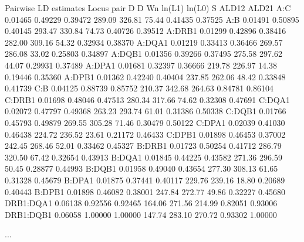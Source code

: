 \documentclass[letterpaper,10pt,english,openany,oneside]{sphinxmanual}
\begin{document}
\begin{sphinxVerbatim}[commandchars=\\\{\}]
Pairwise LD estimates
\PYGZhy{}\PYGZhy{}\PYGZhy{}\PYGZhy{}\PYGZhy{}\PYGZhy{}\PYGZhy{}\PYGZhy{}\PYGZhy{}\PYGZhy{}\PYGZhy{}\PYGZhy{}\PYGZhy{}\PYGZhy{}\PYGZhy{}\PYGZhy{}\PYGZhy{}\PYGZhy{}\PYGZhy{}\PYGZhy{}\PYGZhy{}
Locus pair        D      D\PYGZsq{}      Wn  ln(L\PYGZus{}1) ln(L\PYGZus{}0)      S  ALD\PYGZus{}1\PYGZus{}2  ALD\PYGZus{}2\PYGZus{}1
A:C         0.01465 0.49229 0.39472  \PYGZhy{}289.09 \PYGZhy{}326.81  75.44  0.41435  0.37525
A:B         0.01491 0.50895 0.40145  \PYGZhy{}293.47 \PYGZhy{}330.84  74.73  0.40726  0.39512
A:DRB1      0.01299 0.42896 0.38416  \PYGZhy{}282.00 \PYGZhy{}309.16  54.32  0.32934  0.38370
A:DQA1      0.01219 0.33413 0.36466  \PYGZhy{}269.57 \PYGZhy{}286.08  33.02  0.25803  0.34897
A:DQB1      0.01356 0.39266 0.37495  \PYGZhy{}275.58 \PYGZhy{}297.62  44.07  0.29931  0.37489
A:DPA1      0.01681 0.32397 0.36666  \PYGZhy{}219.78 \PYGZhy{}226.97  14.38  0.19446  0.35360
A:DPB1      0.01362 0.42240 0.40404  \PYGZhy{}237.85 \PYGZhy{}262.06  48.42  0.33848  0.41739
C:B         0.04125 0.88739 0.85752  \PYGZhy{}210.37 \PYGZhy{}342.68 264.63  0.84781  0.86104
C:DRB1      0.01698 0.48046 0.47513  \PYGZhy{}280.34 \PYGZhy{}317.66  74.62  0.32308  0.47691
C:DQA1      0.02072 0.47797 0.49368  \PYGZhy{}263.23 \PYGZhy{}293.74  61.01  0.31386  0.50338
C:DQB1      0.01766 0.45793 0.49879  \PYGZhy{}269.55 \PYGZhy{}305.28  71.46  0.30479  0.50122
C:DPA1      0.02039 0.41030 0.46438  \PYGZhy{}224.72 \PYGZhy{}236.52  23.61  0.21172  0.46433
C:DPB1      0.01898 0.46453 0.37002  \PYGZhy{}242.45 \PYGZhy{}268.46  52.01  0.33462  0.45327
B:DRB1      0.01723 0.50254 0.41712  \PYGZhy{}286.79 \PYGZhy{}320.50  67.42  0.32654  0.43913
B:DQA1      0.01845 0.44225 0.43582  \PYGZhy{}271.36 \PYGZhy{}296.59  50.45  0.28877  0.44993
B:DQB1      0.01958 0.49040 0.43654  \PYGZhy{}277.30 \PYGZhy{}308.13  61.65  0.31328  0.45679
B:DPA1      0.01875 0.37441 0.40117  \PYGZhy{}229.76 \PYGZhy{}239.16  18.80  0.20689  0.40443
B:DPB1      0.01898 0.46082 0.38001  \PYGZhy{}247.84 \PYGZhy{}272.77  49.86  0.32227  0.45680
DRB1:DQA1   0.06138 0.92556 0.92465  \PYGZhy{}164.06 \PYGZhy{}271.56 214.99  0.82051  0.93006
DRB1:DQB1   0.06058 1.00000 1.00000  \PYGZhy{}147.74 \PYGZhy{}283.10 270.72  0.93302  1.00000

...
\end{sphinxVerbatim}
\end{document}
